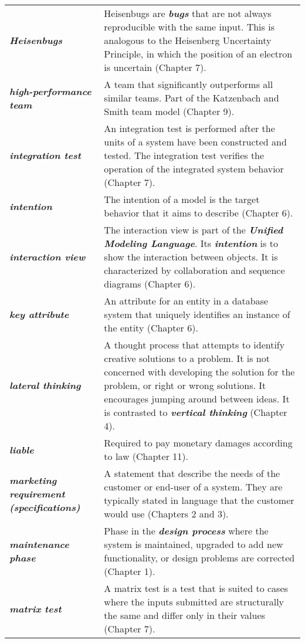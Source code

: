 \begin{longtable} { p{4cm} p{11cm}}
\emph{\textbf{Heisenbugs}} & Heisenbugs are \emph{\textbf{bugs}} that
are not always reproducible with the same input. This is analogous to
the Heisenberg Uncertainty Principle, in which the position of an
electron is uncertain (Chapter 7). \\
\emph{\textbf{high-performance team}} & A team that significantly
outperforms all similar teams. Part of the Katzenbach and Smith team
model (Chapter 9). \\
\emph{\textbf{integration test}} & An integration test is performed
after the units of a system have been constructed and tested. The
integration test verifies the operation of the integrated system
behavior (Chapter 7). \\
\emph{\textbf{intention}} & The intention of a model is the target
behavior that it aims to describe (Chapter 6). \\
\emph{\textbf{interaction view}} & The interaction view is part of the
\emph{\textbf{Unified Modeling Language}}. Its \emph{\textbf{intention}}
is to show the interaction between objects. It is characterized by
collaboration and sequence diagrams (Chapter 6). \\
\emph{\textbf{key attribute}} & An attribute for an entity in a database
system that uniquely identifies an instance of the entity (Chapter
6). \\
\emph{\textbf{lateral thinking}} & A thought process that attempts to
identify creative solutions to a problem. It is not concerned with
developing the solution for the problem, or right or wrong solutions. It
encourages jumping around be­tween ideas. It is contrasted to
\emph{\textbf{vertical thinking}} (Chapter 4). \\
\emph{\textbf{liable}} & Required to pay monetary damages according to
law (Chapter 11). \\
\emph{\textbf{marketing requirement (specifications)}} & A statement
that describe the needs of the customer or end-user of a system. They
are typically stated in language that the customer would use (Chapters 2
and 3). \\
\emph{\textbf{maintenance phase}} & Phase in the \emph{\textbf{design
process}} where the system is maintained, upgraded to add new
functionality, or design problems are corrected (Chapter 1). \\
\emph{\textbf{matrix test}} & A matrix test is a test that is suited to
cases where the inputs submitted are structurally the same and differ
only in their values (Chapter 7). \\

\end{longtable}
